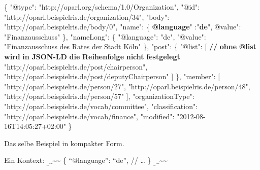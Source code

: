 \documentclass[,a4paper]{article}
\newenvironment{Shaded}{}{}
\newcommand{\DataTypeTok}[1]{\textcolor[rgb]{0.56,0.13,0.00}{{#1}}}
\newcommand{\StringTok}[1]{\textcolor[rgb]{0.25,0.44,0.63}{{#1}}}
\newcommand{\ErrorTok}[1]{\textcolor[rgb]{1.00,0.00,0.00}{\textbf{{#1}}}}
\newcommand{\NormalTok}[1]{{#1}}
\begin{document}
\begin{Shaded}
\begin{Highlighting}[]
\NormalTok{\{}
    \DataTypeTok{"@type"}\NormalTok{: }\StringTok{"http://oparl.org/schema/1.0/Organization"}\NormalTok{,}
    \DataTypeTok{"@id"}\NormalTok{: }\StringTok{"http://oparl.beispielris.de/organization/34"}\NormalTok{,}
    \DataTypeTok{"body"}\NormalTok{: }\StringTok{"http://oparl.beispielris.de/body/0"}\NormalTok{,}
    \DataTypeTok{"name"}\NormalTok{: \{}
        \ErrorTok{@language}\DataTypeTok{" :"}\ErrorTok{de}\DataTypeTok{",}
\DataTypeTok{        @value"}\NormalTok{: }\StringTok{"Finanzausschuss"}
    \NormalTok{\},}
    \DataTypeTok{"nameLong"}\NormalTok{: \{}
        \DataTypeTok{"@language"}\NormalTok{: }\StringTok{"de"}\NormalTok{,}
        \DataTypeTok{"@value"}\NormalTok{: }\StringTok{"Finanzausschuss des Rates der Stadt Köln"}
    \NormalTok{\},}
    \DataTypeTok{"post"}\NormalTok{: \{}
        \DataTypeTok{"@list"}\NormalTok{: [}
        \ErrorTok{//} \ErrorTok{ohne} \ErrorTok{@list} \ErrorTok{wird} \ErrorTok{in} \ErrorTok{JSON-LD} \ErrorTok{die} \ErrorTok{Reihenfolge} \ErrorTok{nicht} \ErrorTok{festgelegt}
        \StringTok{"http://oparl.beispielris.de/post/chairperson"}\NormalTok{,}
        \StringTok{"http://oparl.beispielris.de/post/deputyChairperson"}
        \NormalTok{]}
    \NormalTok{\},}
    \DataTypeTok{"member"}\NormalTok{: [}
        \StringTok{"http://oparl.beispielris.de/person/27"}\NormalTok{,}
        \StringTok{"http://oparl.beispielris.de/person/48"}\NormalTok{,}
        \StringTok{"http://oparl.beispielris.de/person/57"}
    \NormalTok{],}
    \DataTypeTok{"organizationType"}\NormalTok{: }\StringTok{"http://oparl.beispielris.de/vocab/committee"}\NormalTok{,}
    \DataTypeTok{"classification"}\NormalTok{: }\StringTok{"http://oparl.beispielris.de/vocab/finance"}\NormalTok{,}
    \DataTypeTok{"modified"}\NormalTok{: }\StringTok{"2012-08-16T14:05:27+02:00"}
\NormalTok{\}}
\end{Highlighting}
\end{Shaded}

Das selbe Beispiel in kompakter Form.

Ein Kontext:
\textsubscript{\textsubscript{\textasciitilde{}}\textasciitilde{}}\textasciitilde{}\textasciitilde{}
\{ ``@language'': ``de'', // \ldots{} \}
\textsubscript{\textsubscript{\textasciitilde{}}\textasciitilde{}}\textasciitilde{}\textasciitilde{}
\end{document}
